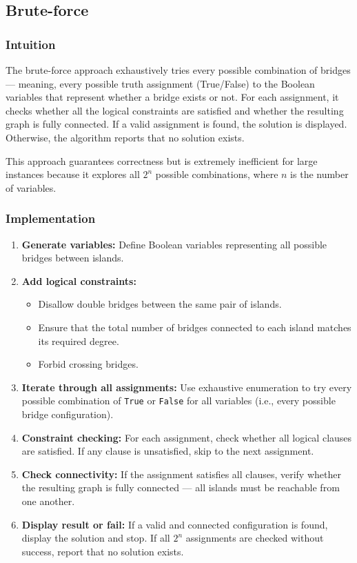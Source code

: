 \subsection{Brute-force}

\subsubsection{Intuition}
The brute-force approach exhaustively tries every possible combination of bridges — meaning, every possible truth assignment (True/False) to the Boolean variables that represent whether a bridge exists or not. For each assignment, it checks whether all the logical constraints are satisfied and whether the resulting graph is fully connected. If a valid assignment is found, the solution is displayed. Otherwise, the algorithm reports that no solution exists.

This approach guarantees correctness but is extremely inefficient for large instances because it explores all $2^n$ possible combinations, where $n$ is the number of variables.

\subsubsection{Implementation}

\begin{enumerate}
  \item \textbf{Generate variables:} Define Boolean variables representing all possible bridges between islands.

  \item \textbf{Add logical constraints:}
  \begin{itemize}
    \item Disallow double bridges between the same pair of islands.
    \item Ensure that the total number of bridges connected to each island matches its required degree.
    \item Forbid crossing bridges.
  \end{itemize}

  \item \textbf{Iterate through all assignments:}
  Use exhaustive enumeration to try every possible combination of \texttt{True} or \texttt{False} for all variables (i.e., every possible bridge configuration).

  \item \textbf{Constraint checking:}
  For each assignment, check whether all logical clauses are satisfied. If any clause is unsatisfied, skip to the next assignment.

  \item \textbf{Check connectivity:}
  If the assignment satisfies all clauses, verify whether the resulting graph is fully connected — all islands must be reachable from one another.

  \item \textbf{Display result or fail:}
  If a valid and connected configuration is found, display the solution and stop. If all $2^n$ assignments are checked without success, report that no solution exists.
\end{enumerate}